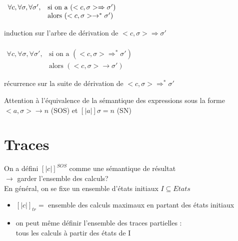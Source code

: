 \documentclass[10pt,a4paper]{article}
\newcommand{\semm}[1]{\left[| #1 | \right]}
\begin{document}
\begin{lem}[1] 
$ \begin{array}{l l}
\\
\forall c, \forall \sigma, \forall \sigma', & \text{si on a }(<c, \sigma> \Rightarrow \sigma')\\
											& \text{alors } (<c, \sigma> \rightarrow^* \sigma')
\end{array}$
\end{lem}

\begin{dem}
 induction sur l'arbre de dérivation de $<c, \sigma> \Rightarrow \sigma'$
\end{dem}


\begin{lem}
$ \begin{array}{ll}
\\
\forall c, \forall \sigma, \forall \sigma', &\text{si on a }(<c, \sigma> \Rightarrow^* \sigma')\\
											& \text{alors } (<c, \sigma> \rightarrow \sigma')
\end{array}$
\end{lem}

\begin{dem}
 récurrence sur la suite de dérivation de $<c, \sigma> \Rightarrow^* \sigma'$
\end{dem}


\begin{rem}Attention à l'équivalence de la sémantique des expressions sous la forme \\$<a, \sigma> \rightarrow n$ (SOS) et $\semm{a} \sigma = n$ (SN)
\end{rem}

\section{Traces}
On a défini $\semm{c}^{SOS}$ comme une sémantique de résultat\\
$\longrightarrow$ garder l'ensemble des calculs?\\
En général, on se fixe un ensemble d'états initiaux $I \subseteq Etats$
\begin{itemize}
\item $\semm{c}_{tr} = $ ensemble des calculs maximaux en partant des états initiaux
\item on peut même définir l'ensemble des traces partielles : \\
tous les calculs à partir des états de I
\end{itemize}
\end{document}
